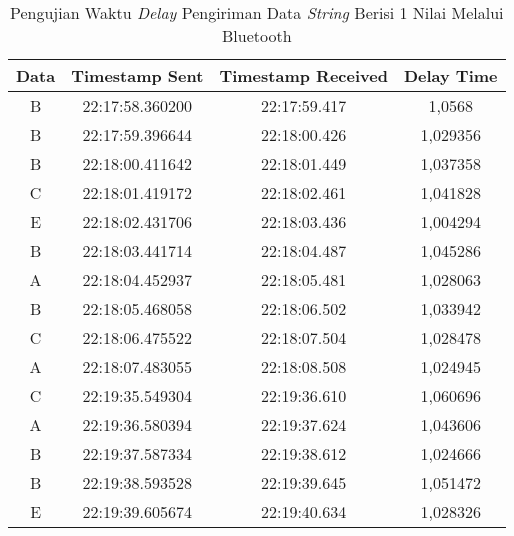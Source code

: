\begin{table}[!ht]
  \centering
  \caption{Pengujian Waktu \emph{Delay} Pengiriman Data \emph{String} Berisi 1 Nilai Melalui Bluetooth}
  \label{tbl:delayBluetooth1}
  \begin{tabular}{|ccc|c|}
  \hline
  \multicolumn{1}{|c|}{Data} & \multicolumn{1}{c|}{Timestamp Sent}  & Timestamp Received & Delay Time  \\ \hline
  \multicolumn{1}{|c|}{B}    & \multicolumn{1}{c|}{22:17:58.360200} & 22:17:59.417       & 1,0568      \\ \hline
  \multicolumn{1}{|c|}{B}    & \multicolumn{1}{c|}{22:17:59.396644} & 22:18:00.426       & 1,029356    \\ \hline
  \multicolumn{1}{|c|}{B}    & \multicolumn{1}{c|}{22:18:00.411642} & 22:18:01.449       & 1,037358    \\ \hline
  \multicolumn{1}{|c|}{C}    & \multicolumn{1}{c|}{22:18:01.419172} & 22:18:02.461       & 1,041828    \\ \hline
  \multicolumn{1}{|c|}{E}    & \multicolumn{1}{c|}{22:18:02.431706} & 22:18:03.436       & 1,004294    \\ \hline
  \multicolumn{1}{|c|}{B}    & \multicolumn{1}{c|}{22:18:03.441714} & 22:18:04.487       & 1,045286    \\ \hline
  \multicolumn{1}{|c|}{A}    & \multicolumn{1}{c|}{22:18:04.452937} & 22:18:05.481       & 1,028063    \\ \hline
  \multicolumn{1}{|c|}{B}    & \multicolumn{1}{c|}{22:18:05.468058} & 22:18:06.502       & 1,033942    \\ \hline
  \multicolumn{1}{|c|}{C}    & \multicolumn{1}{c|}{22:18:06.475522} & 22:18:07.504       & 1,028478    \\ \hline
  \multicolumn{1}{|c|}{A}    & \multicolumn{1}{c|}{22:18:07.483055} & 22:18:08.508       & 1,024945    \\ \hline
  \multicolumn{1}{|c|}{C}    & \multicolumn{1}{c|}{22:19:35.549304} & 22:19:36.610       & 1,060696    \\ \hline
  \multicolumn{1}{|c|}{A}    & \multicolumn{1}{c|}{22:19:36.580394} & 22:19:37.624       & 1,043606    \\ \hline
  \multicolumn{1}{|c|}{B}    & \multicolumn{1}{c|}{22:19:37.587334} & 22:19:38.612       & 1,024666    \\ \hline
  \multicolumn{1}{|c|}{B}    & \multicolumn{1}{c|}{22:19:38.593528} & 22:19:39.645       & 1,051472    \\ \hline
  \multicolumn{1}{|c|}{E}    & \multicolumn{1}{c|}{22:19:39.605674} & 22:19:40.634       & 1,028326    \\ \hline

\end{tabular}
\end{table}

